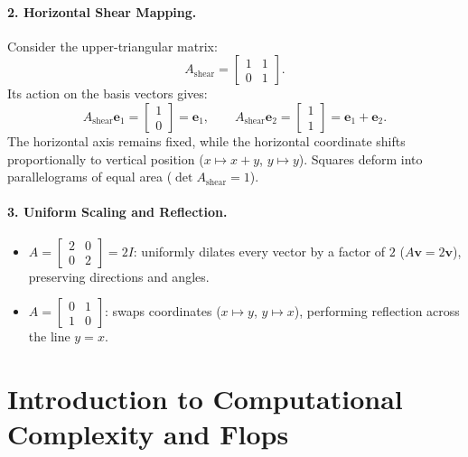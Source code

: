 \paragraph{2. Horizontal Shear Mapping.}
Consider the upper-triangular matrix:
\begin{equation}
    A_{\text{shear}} = \begin{bmatrix} 1 & 1 \\ 0 & 1 \end{bmatrix}.
\end{equation}
Its action on the basis vectors gives:
\begin{equation}
    A_{\text{shear}} \mathbf{e}_1 = \begin{bmatrix} 1 \\ 0 \end{bmatrix} = \mathbf{e}_1, \qquad A_{\text{shear}} \mathbf{e}_2 = \begin{bmatrix} 1 \\ 1 \end{bmatrix} = \mathbf{e}_1 + \mathbf{e}_2.
\end{equation}
The horizontal axis remains fixed, while the horizontal coordinate shifts proportionally to vertical position ($x \mapsto x + y$, $y \mapsto y$). Squares deform into parallelograms of equal area ($\det A_{\text{shear}} = 1$).

\paragraph{3. Uniform Scaling and Reflection.}
\begin{itemize}
    \item $A = \begin{bmatrix} 2 & 0 \\ 0 & 2 \end{bmatrix} = 2 I$: uniformly dilates every vector by a factor of $2$ ($A \mathbf{v} = 2 \mathbf{v}$), preserving directions and angles.
    \item $A = \begin{bmatrix} 0 & 1 \\ 1 & 0 \end{bmatrix}$: swaps coordinates ($x \mapsto y$, $y \mapsto x$), performing reflection across the line $y = x$.
\end{itemize}

\FloatBarrier
\section{Introduction to Computational Complexity and Flops}

